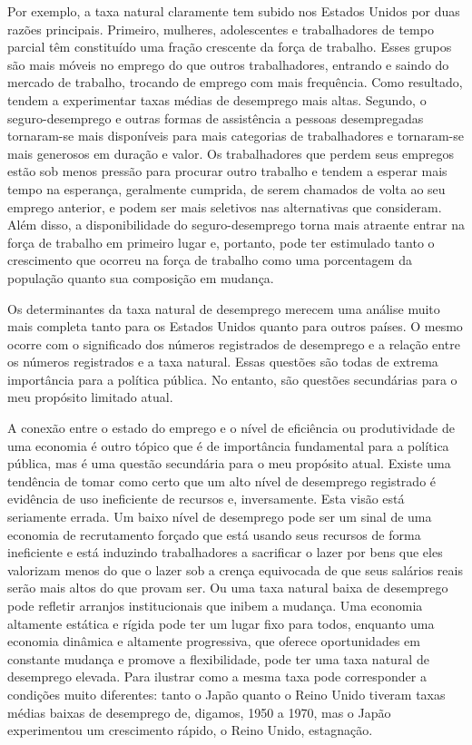 \documentclass[12pt]{article}
\begin{document}
Por exemplo, a taxa natural claramente tem subido nos Estados Unidos por duas razões principais. Primeiro, mulheres, adolescentes e trabalhadores de tempo parcial têm constituído uma fração crescente da força de trabalho. Esses grupos são mais móveis no emprego do que outros trabalhadores, entrando e saindo do mercado de trabalho, trocando de emprego com mais frequência. Como resultado, tendem a experimentar taxas médias de desemprego mais altas. Segundo, o seguro-desemprego e outras formas de assistência a pessoas desempregadas tornaram-se mais disponíveis para mais categorias de trabalhadores e tornaram-se mais generosos em duração e valor. Os trabalhadores que perdem seus empregos estão sob menos pressão para procurar outro trabalho e tendem a esperar mais tempo na esperança, geralmente cumprida, de serem chamados de volta ao seu emprego anterior, e podem ser mais seletivos nas alternativas que consideram. Além disso, a disponibilidade do seguro-desemprego torna mais atraente entrar na força de trabalho em primeiro lugar e, portanto, pode ter estimulado tanto o crescimento que ocorreu na força de trabalho como uma porcentagem da população quanto sua composição em mudança.

Os determinantes da taxa natural de desemprego merecem uma análise muito mais completa tanto para os Estados Unidos quanto para outros países. O mesmo ocorre com o significado dos números registrados de desemprego e a relação entre os números registrados e a taxa natural. Essas questões são todas de extrema importância para a política pública. No entanto, são questões secundárias para o meu propósito limitado atual.

A conexão entre o estado do emprego e o nível de eficiência ou produtividade de uma economia é outro tópico que é de importância fundamental para a política pública, mas é uma questão secundária para o meu propósito atual. Existe uma tendência de tomar como certo que um alto nível de desemprego registrado é evidência de uso ineficiente de recursos e, inversamente. Esta visão está seriamente errada. Um baixo nível de desemprego pode ser um sinal de uma economia de recrutamento forçado que está usando seus recursos de forma ineficiente e está induzindo trabalhadores a sacrificar o lazer por bens que eles valorizam menos do que o lazer sob a crença equivocada de que seus salários reais serão mais altos do que provam ser. Ou uma taxa natural baixa de desemprego pode refletir arranjos institucionais que inibem a mudança. Uma economia altamente estática e rígida pode ter um lugar fixo para todos, enquanto uma economia dinâmica e altamente progressiva, que oferece oportunidades em constante mudança e promove a flexibilidade, pode ter uma taxa natural de desemprego elevada. Para ilustrar como a mesma taxa pode corresponder a condições muito diferentes: tanto o Japão quanto o Reino Unido tiveram taxas médias baixas de desemprego de, digamos, 1950 a 1970, mas o Japão experimentou um crescimento rápido, o Reino Unido, estagnação.
\end{document}
